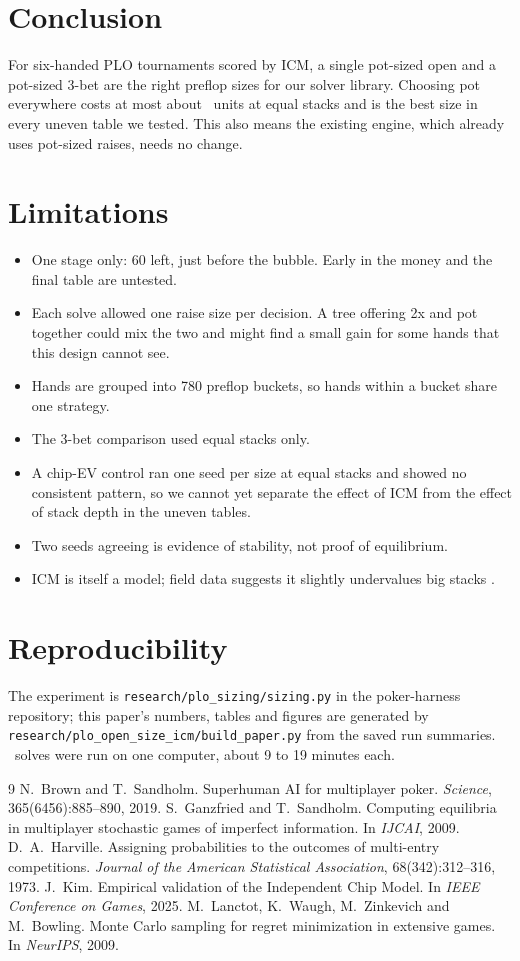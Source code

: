 \documentclass[10pt]{article}
\begin{document}
\section{Conclusion}
For six-handed PLO tournaments scored by ICM, a single pot-sized open and a pot-sized 3-bet are the
right preflop sizes for our solver library. Choosing pot everywhere costs at most about
\EqLargest\ units at equal stacks and is the best size in every uneven table we tested. This also
means the existing engine, which already uses pot-sized raises, needs no change.

\section{Limitations}
\begin{itemize}
\item One stage only: 60 left, just before the bubble. Early in the money and the final table are untested.
\item Each solve allowed one raise size per decision. A tree offering 2x and pot together could mix the
two and might find a small gain for some hands that this design cannot see.
\item Hands are grouped into 780 preflop buckets, so hands within a bucket share one strategy.
\item The 3-bet comparison used equal stacks only.
\item A chip-EV control ran one seed per size at equal stacks and showed no consistent pattern, so we
cannot yet separate the effect of ICM from the effect of stack depth in the uneven tables.
\item Two seeds agreeing is evidence of stability, not proof of equilibrium.
\item ICM is itself a model; field data suggests it slightly undervalues big stacks \cite{kim}.
\end{itemize}

\section*{Reproducibility}
The experiment is \texttt{research/plo\_sizing/sizing.py} in the poker-harness repository; this paper's
numbers, tables and figures are generated by \texttt{research/plo\_open\_size\_icm/build\_paper.py}
from the saved run summaries. \Solves\ solves were run on one computer, about 9 to 19 minutes
each.

\begin{thebibliography}{9}
 N.~Brown and T.~Sandholm. Superhuman AI for multiplayer poker. \emph{Science}, 365(6456):885--890, 2019.
 S.~Ganzfried and T.~Sandholm. Computing equilibria in multiplayer stochastic games of imperfect information. In \emph{IJCAI}, 2009.
 D.~A.~Harville. Assigning probabilities to the outcomes of multi-entry competitions. \emph{Journal of the American Statistical Association}, 68(342):312--316, 1973.
 J.~Kim. Empirical validation of the Independent Chip Model. In \emph{IEEE Conference on Games}, 2025.
 M.~Lanctot, K.~Waugh, M.~Zinkevich and M.~Bowling. Monte Carlo sampling for regret minimization in extensive games. In \emph{NeurIPS}, 2009.
\end{thebibliography}
\end{document}
